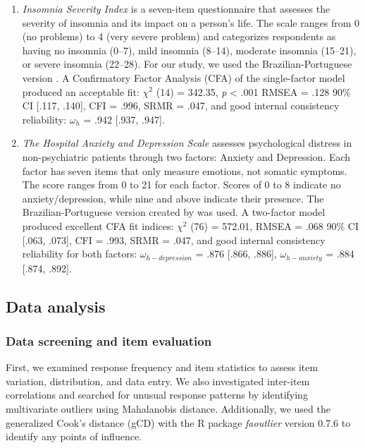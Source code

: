 \documentclass[
  12pt,
  twoside,
  openright,
  a4paper,
  chapter=TITLE,
  section=TITLE,
  brazil]{abntex2}
\begin{document}
\begin{enumerate}
\def\labelenumi{\arabic{enumi}.}
\item
  \emph{Insomnia Severity Index}
  \autocites[ISI,][]{bastien2001,morin2011a} is a seven-item
  questionnaire that assesses the severity of insomnia and its impact on
  a person's life. The scale ranges from 0 (no problems) to 4 (very
  severe problem) and categorizes respondents as having no insomnia
  (0--7), mild insomnia (8--14), moderate insomnia (15--21), or severe
  insomnia (22--28). For our study, we used the Brazilian-Portuguese
  version \autocite{castro}. A Confirmatory Factor Analysis (CFA) of the
  single-factor model produced an acceptable fit: \(\chi^2\) (14) =
  342.35, \emph{p} \textless{} .001 RMSEA = .128 90\% CI {[}.117,
  .140{]}, CFI = .996, SRMR = .047, and good internal consistency
  reliability: \(\omega_h\) = .942 {[}.937, .947{]}.
\item
  \emph{The Hospital Anxiety and Depression Scale}
  \autocite[HADS,][]{zigmond1983hospital} assesses psychological
  distress in non-psychiatric patients through two factors: Anxiety and
  Depression. Each factor has seven items that only measure emotions,
  not somatic symptoms. The score ranges from 0 to 21 for each factor.
  Scores of 0 to 8 indicate no anxiety/depression, while nine and above
  indicate their presence. The Brazilian-Portuguese version created by
  \textcite{botega1995transtornos} was used. A two-factor model produced
  excellent CFA fit indices: \(\chi^2\) (76) = 572.01, RMSEA = .068 90\%
  CI {[}.063, .073{]}, CFI = .993, SRMR = .047, and good internal
  consistency reliability for both factors: \(\omega_{h-depression}\) =
  .876 {[}.866, .886{]}, \(\omega_{h-anxiety}\) = .884 {[}.874, .892{]}.
\end{enumerate}

\hypertarget{data-analysis}{%
\subsection{Data analysis}\label{data-analysis}}

\hypertarget{data-screening-and-item-evaluation}{%
\subsubsection{Data screening and item
evaluation}\label{data-screening-and-item-evaluation}}

First, we examined response frequency and item statistics to assess item
variation, distribution, and data entry. We also investigated inter-item
correlations and searched for unusual response patterns by identifying
multivariate outliers using Mahalanobis distance. Additionally, we used
the generalized Cook's distance (gCD) with the R package
\emph{faoutlier} version 0.7.6 \autocite{faoutlier} to identify any
points of influence.
\end{document}
